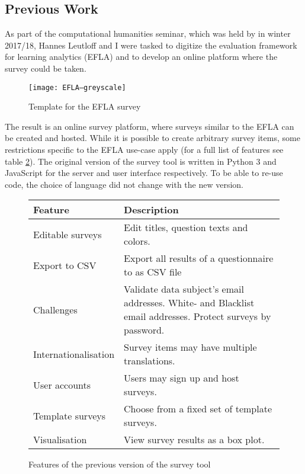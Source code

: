\subsection{Previous Work}
    As part of the computational humanities seminar, which was held by \profhd in winter 2017/18, Hannes Leutloff
    and I were tasked to digitize the evaluation framework for learning analytics (EFLA) \cite{efla} and to
    develop an online platform where the survey could be taken.

    \begin{figure}
        \centering
        \texttt{[image: EFLA--greyscale]}
        \caption{Template for the EFLA survey \cite{efla-website}}
        \label{fig:efla-template}
    \end{figure}

   The result is an online survey platform, where surveys similar to the EFLA can be created
   and hosted. While it is possible to create arbitrary survey items, some restrictions
   specific to the EFLA use-case apply (for a full list of features see table \ref{table:v1-features}).
   The original version of the survey tool is written in Python 3 and JavaScript for the server
   and user interface respectively. To be able to re-use code, the choice of language did not
   change with the new version.
   

   \begin{figure}
       \begin{tabularx}{\textwidth}{|l|X|}
            \hline
            Feature & Description \\
            \hline \hline
            Editable surveys & Edit titles, question texts and colors.\\
            Export to CSV & Export all results of a questionnaire to as CSV file\\
            Challenges & Validate data subject's email addresses. 
            White- and Blacklist email addresses. Protect surveys by password.\\
            Internationalisation & Survey items may have multiple translations.\\
            User accounts & Users may sign up and host surveys.\\
            Template surveys & Choose from a fixed set of template surveys.\\
            Visualisation & View survey results as a box plot.\\
            \hline
       \end{tabularx}
       \caption{Features of the previous version of the survey tool}
       \label{table:v1-features}
   \end{figure}

